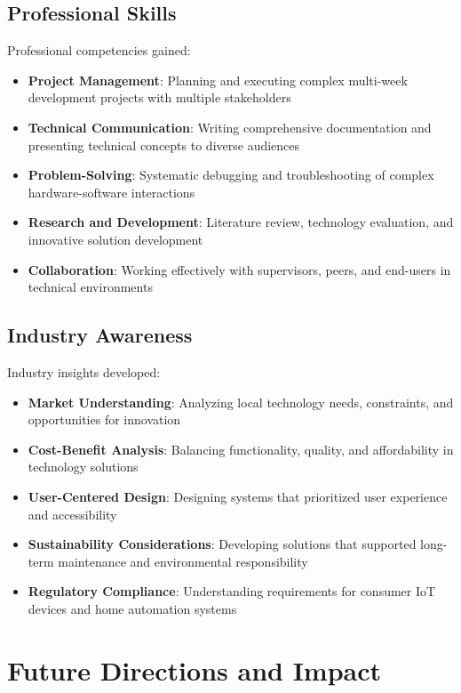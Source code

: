 \documentclass[12pt,a4paper]{report}
\begin{document}
\subsection{Professional Skills}
\noindent Professional competencies gained:
\begin{itemize}
\item \textbf{Project Management}: Planning and executing complex multi-week development projects with multiple stakeholders
\item \textbf{Technical Communication}: Writing comprehensive documentation and presenting technical concepts to diverse audiences
\item \textbf{Problem-Solving}: Systematic debugging and troubleshooting of complex hardware-software interactions
\item \textbf{Research and Development}: Literature review, technology evaluation, and innovative solution development
\item \textbf{Collaboration}: Working effectively with supervisors, peers, and end-users in technical environments
\end{itemize}

\subsection{Industry Awareness}
\noindent Industry insights developed:
\begin{itemize}
\item \textbf{Market Understanding}: Analyzing local technology needs, constraints, and opportunities for innovation
\item \textbf{Cost-Benefit Analysis}: Balancing functionality, quality, and affordability in technology solutions
\item \textbf{User-Centered Design}: Designing systems that prioritized user experience and accessibility
\item \textbf{Sustainability Considerations}: Developing solutions that supported long-term maintenance and environmental responsibility
\item \textbf{Regulatory Compliance}: Understanding requirements for consumer IoT devices and home automation systems
\end{itemize}

\section{Future Directions and Impact}
\end{document}
